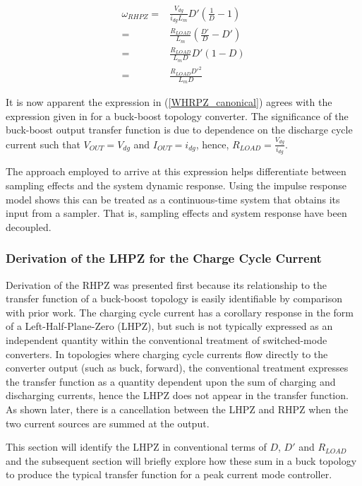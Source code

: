 \documentclass[conference]{IEEEtran}
\begin{document}
\begin{align}
	\omega_{RHPZ} =& \frac{V_{dg}}{ i_{dg} L_m } D' (\frac{1}{D} - 1) \nonumber \\
	=& \frac{R_{LOAD}}{L_m} (\frac{D'}{D} - D') \nonumber \\
	=&  \frac{R_{LOAD}}{L_m D} D'(1-D) \nonumber \\
	=& \frac{R_{LOAD} D'^2}{L_m D}
	\label{WHRPZ_canonical}
\end{align}

It is now apparent the expression in (\ref{WHRPZ_canonical}) agrees with the expression given in \cite{b2} for a buck-boost topology converter.  The significance of the buck-boost output transfer function is due to dependence on the discharge cycle current such that $V_{OUT} = V_{dg}$ and $I_{OUT} = i_{dg}$, hence, $R_{LOAD} = \frac{V_{dg}}{i_{dg}}$.

The approach employed to arrive at this expression helps differentiate between sampling effects and the system dynamic response.  Using the impulse response model shows this can be treated as a continuous-time system that obtains its input from a sampler.  That is, sampling effects and system response have been decoupled.

\subsubsection {Derivation of the LHPZ for the Charge Cycle Current}
Derivation of the RHPZ was presented first because its relationship to the transfer function of a buck-boost topology is easily identifiable by comparison with prior work.  The charging cycle current has a corollary response in the form of a Left-Half-Plane-Zero (LHPZ), but such is not typically expressed as an independent quantity within the conventional treatment of switched-mode converters. In topologies where charging cycle currents flow directly to the converter output (such as buck, forward), the conventional treatment expresses the transfer function as a quantity dependent upon the sum of charging and discharging currents, hence the LHPZ does not appear in the transfer function.  As shown later, there is a cancellation between the LHPZ and RHPZ when the two current sources are summed at the output.

This section will identify the LHPZ in conventional terms of $D$, $D'$ and $R_{LOAD}$ and the subsequent section will briefly explore how these sum in a buck topology to produce the typical transfer function for a peak current mode controller.
\end{document}
